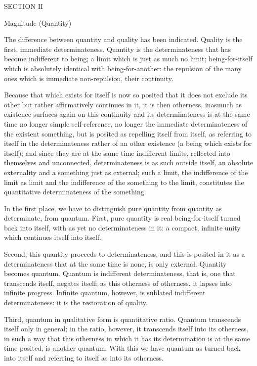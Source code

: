 SECTION II

Magnitude (Quantity)

The difference between quantity and quality has been indicated.
Quality is the first, immediate determinateness.
Quantity is the determinateness that
has become indifferent to being;
a limit which is just as much no limit;
being-for-itself which is absolutely
identical with being-for-another:
the repulsion of the many ones
which is immediate non-repulsion,
their continuity.

Because that which exists for itself is now so posited
that it does not exclude its other
but rather affirmatively continues in it,
it is then otherness, inasmuch as
existence surfaces again on this continuity
and its determinateness is at the same time
no longer simple self-reference,
no longer the immediate determinateness
of the existent something,
but is posited as repelling itself from itself,
as referring to itself in the determinateness
rather of an other existence
(a being which exists for itself);
and since they are at the same time indifferent limits,
reflected into themselves and unconnected,
determinateness is as such outside itself,
an absolute externality and a something just as external;
such a limit, the indifference of the limit as limit
and the indifference of the something to the limit,
constitutes the quantitative determinateness of the something.

In the first place, we have to distinguish pure quantity
from quantity as determinate, from quantum.
First, pure quantity is real being-for-itself
turned back into itself, with as yet no determinateness in it:
a compact, infinite unity which continues itself into itself.

Second, this quantity proceeds to determinateness,
and this is posited in it as a determinateness
that at the same time is none, is only external.
Quantity becomes quantum.
Quantum is indifferent determinateness,
that is, one that transcends itself, negates itself;
as this otherness of otherness,
it lapses into infinite progress.
Infinite quantum, however, is
sublated indifferent determinateness:
it is the restoration of quality.

Third, quantum in qualitative form is quantitative ratio.
Quantum transcends itself only in general;
in the ratio, however, it transcends itself into its otherness,
in such a way that this otherness in which it has its determination
is at the same time posited, is another quantum.
With this we have quantum as turned back into itself
and referring to itself as into its otherness.

